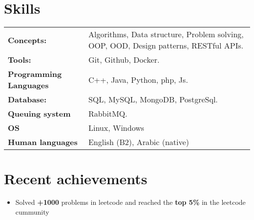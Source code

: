 \documentclass[a4,10pt]{article}
\newenvironment{zitemize}{
\begin{itemize}\itemsep0pt \parskip0pt \parsep1pt}
{\end{itemize}\vspace{-0.5cm}}
\newcommand{\hskills}[1]{
\textbf{\bfseries #1} }
\begin{document}
\section{Skills}
\begin{tabular}{p{14em} p{48em}}
\hskills{Concepts:} &  Algorithms, Data structure, Problem solving, OOP, OOD, Design
patterns, RESTful APIs. \\
\hskills{Tools:} & Git, Github, Docker.  \\
\hskills{Programming Languages} & C++, Java, Python, php, Js. \\
\hskills{Database:} & SQL, MySQL, MongoDB, PostgreSql. \\
\hskills{Queuing system} & RabbitMQ. \\
\hskills{OS} & Linux, Windows \\
\hskills{Human languages} & English (B2), Arabic (native) \\
\end{tabular}
\vspace{-0.2cm}


\section{Recent achievements} 
\renewcommand\refname{\vskip -1.5em}
\begin{zitemize}
    \item Solved \textbf{+1000} problems in leetcode and reached the \textbf{top 5\%} in the
    leetcode cummunity
\end{zitemize}
\printbibliography[heading=none]
\vspace{-0.4cm}


\end{document}
